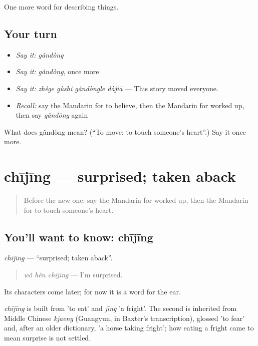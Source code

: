 \begin{grammarlens}[title={What you've built}]
One more word for describing things.
\end{grammarlens}

\subsection*{Your turn}
\begin{itemize}
\raggedright
  \item \emph{Say it:} \emph{gǎndòng}
  \item \emph{Say it:} \emph{gǎndòng}, once more
  \item \emph{Say it:} \emph{zhège gùshi gǎndòngle dàjiā} — This story moved everyone.
  \item \emph{Recall:} say the Mandarin for to believe, then the Mandarin for worked up, then say \emph{gǎndòng} again
\end{itemize}

\begin{tcolorbox}[breakable,colback=teal!4,colframe=teal!35!black,title={Before you move on}]
What does gǎndòng mean? (\textquotedblleft{}To move; to touch someone's heart\textquotedblright{}.) Say it once more.
\end{tcolorbox}
\section[chījīng]{chījīng — surprised; taken aback}

\label{lesson:ZH-C271-chijing}



\begin{quote}
Before the new one: say the Mandarin for worked up, then the Mandarin for to touch someone's heart.
\end{quote}

\subsection*{You'll want to know: chījīng}
\emph{chījīng} — \textquotedblleft{}surprised; taken aback\textquotedblright{}.

\begin{quote}
\emph{wǒ hěn chījīng} — I'm surprised.
\end{quote}

Its characters come later; for now it is a word for the ear.

\begin{cousinweb}
\emph{chījīng} is built from  'to eat' and \emph{jīng} 'a fright'. The second is inherited from Middle Chinese \emph{kjaeng} (Guangyun, in Baxter's transcription), glossed 'to fear' and, after an older dictionary, 'a horse taking fright'; how eating a fright came to mean surprise is not settled.
\end{cousinweb}

